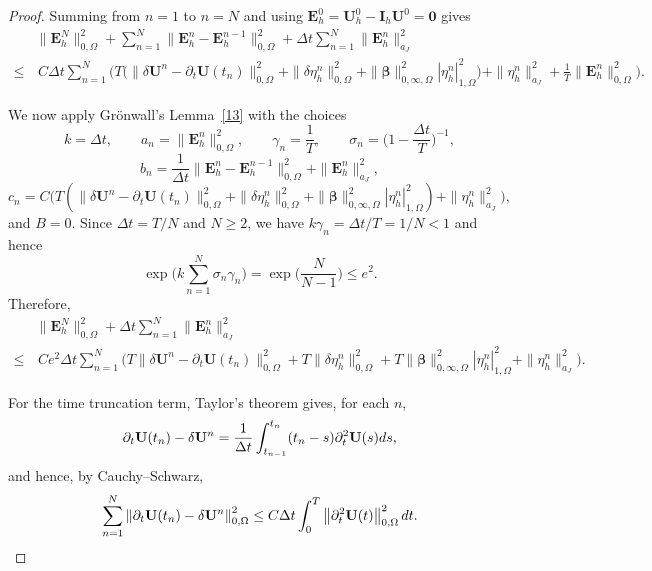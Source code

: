 \documentclass[10pt,a4paper]{amsart}
\newcommand\bE{\mathbf{E}}
\newcommand\bU{\mathbf{U}}
\newcommand\bbeta{{\boldsymbol{\beta}}}
\begin{document}
\begin{proof}
Summing from $n=1$ to $n=N$ and using $\bE_h^{0}=\bU_h^0-\mathbf I_h\bU^0=\mathbf 0$ gives
\begin{equation}
	\begin{aligned}\label{error432}
	&\|\bE_h^N \|_{0,\Omega}^2
	+\sum_{n=1}^{N}\|\bE_h^n - \bE_h^{n-1}\|_{0,\Omega}^2
	+ \Delta t \sum_{n=1}^{N}\|\bE_h^n \|_{a_{J}}^{2}\\
	\leq&\, C\Delta t\sum_{n=1}^{N}\bigg(
	T\Big(\|\delta \bU^{n}-\partial_{t}\bU(t_n)\|_{0,\Omega}^{2}
	+\|\delta\eta_h^n\|_{0,\Omega}^{2}
	+\|\bbeta\|_{0,\infty,\Omega}^{2} |\eta_h^n|_{1,\Omega}^{2}\Big)
	+\|\eta_h^n\|_{a_J}^{2}
	+\frac{1}{T}\|\bE_h^n\|_{0,\Omega}^{2}\bigg).
	\end{aligned}
\end{equation}

We now apply Gr\"{o}nwall's Lemma~\ref{13} with the choices
\[
	k=\Delta t,\qquad
	a_n=\|\bE_h^n\|_{0,\Omega}^2,\qquad
	\gamma_n=\frac{1}{T},\qquad
	\sigma_n=\Big(1-\frac{\Delta t}{T}\Big)^{-1},
\]
\[
	b_n=\frac{1}{\Delta t}\|\bE_h^n-\bE_h^{n-1}\|_{0,\Omega}^2+\|\bE_h^n\|_{a_J}^{2},
	\]
\[
	c_n=C\Big(T(\|\delta \bU^{n}-\partial_{t}\bU(t_n)\|_{0,\Omega}^{2}
	+\|\delta\eta_h^n\|_{0,\Omega}^{2}
	+\|\bbeta\|_{0,\infty,\Omega}^{2} |\eta_h^n|_{1,\Omega}^{2})
	+\|\eta_h^n\|_{a_J}^{2}\Big),
\]
and $B=0$. Since $\Delta t=T/N$ and $N\ge 2$, we have $k\gamma_n=\Delta t/T=1/N<1$ and hence
\[
	\exp\Big(k\sum_{n=1}^{N}\sigma_n\gamma_n\Big)
	=\exp\Big(\frac{N}{N-1}\Big)\le e^{2}.
\]
Therefore,
\begin{align}
	&\|\bE_h^N \|_{0,\Omega}^2+\Delta t \sum_{n=1}^{N}\|\bE_h^n \|_{a_{J}}^{2} \nonumber\\
	\leq&\,  C e^{2} \Delta t\sum_{n=1}^{N}\Big(
	T\|\delta \bU^{n}-\partial_{t}\bU(t_n)\|_{0,\Omega}^{2}
	+T\|\delta\eta_h^n\|_{0,\Omega}^{2}
	+T\|\bbeta\|_{0,\infty,\Omega}^{2} |\eta_h^n|_{1,\Omega}^{2}
	+\|\eta_h^n\|_{a_J}^{2}\Big).\label{53last}
\end{align}

For the time truncation term, Taylor's theorem gives, for each $n$,
\[
	\partial_t \bU(t_n)-\delta \bU^n
	=\frac{1}{\Delta t}\int_{t_{n-1}}^{t_n}(t_n-s) \partial_t^2\bU(s) {\rm d}s,
\]
and hence, by Cauchy--Schwarz,
\begin{equation}
	\sum_{n=1}^{N} \left\|\partial_t\mathbf{U}(t_{n})-\delta \mathbf{U}^n\right\|_{0,\Omega}^2
	\leq C\Delta t\int_{0}^{T} \left\|\partial_{t}^{2}\mathbf{U}(t)\right\|_{0,\Omega}^2 {\rm d}t.  \label{time_trunc}
\end{equation}


\end{proof}
\end{document}
